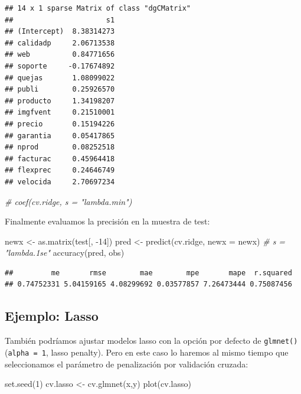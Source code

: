 \documentclass[
  spanish,
]{book}
\newenvironment{Shaded}{\begin{snugshade}}{\end{snugshade}}
\newcommand{\AttributeTok}[1]{\textcolor[rgb]{0.77,0.63,0.00}{#1}}
\newcommand{\CommentTok}[1]{\textcolor[rgb]{0.56,0.35,0.01}{\textit{#1}}}
\newcommand{\DecValTok}[1]{\textcolor[rgb]{0.00,0.00,0.81}{#1}}
\newcommand{\FunctionTok}[1]{\textcolor[rgb]{0.00,0.00,0.00}{#1}}
\newcommand{\NormalTok}[1]{#1}
\newcommand{\OtherTok}[1]{\textcolor[rgb]{0.56,0.35,0.01}{#1}}
\newcommand{\SpecialCharTok}[1]{\textcolor[rgb]{0.00,0.00,0.00}{#1}}
\theoremstyle{break}
\theoremstyle{definition}
\theoremstyle{definition}
\theoremstyle{definition}
\theoremstyle{definition}
\theoremstyle{remark}
\begin{document}
\begin{verbatim}
## 14 x 1 sparse Matrix of class "dgCMatrix"
##                      s1
## (Intercept)  8.38314273
## calidadp     2.06713538
## web          0.84771656
## soporte     -0.17674892
## quejas       1.08099022
## publi        0.25926570
## producto     1.34198207
## imgfvent     0.21510001
## precio       0.15194226
## garantia     0.05417865
## nprod        0.08252518
## facturac     0.45964418
## flexprec     0.24646749
## velocida     2.70697234
\end{verbatim}

\begin{Shaded}
\begin{Highlighting}[]
\CommentTok{\# coef(cv.ridge, s = "lambda.min")}
\end{Highlighting}
\end{Shaded}

Finalmente evaluamos la precisión en la muestra de test:

\begin{Shaded}
\begin{Highlighting}[]
\NormalTok{newx }\OtherTok{\textless{}{-}} \FunctionTok{as.matrix}\NormalTok{(test[, }\SpecialCharTok{{-}}\DecValTok{14}\NormalTok{])}
\NormalTok{pred }\OtherTok{\textless{}{-}} \FunctionTok{predict}\NormalTok{(cv.ridge, }\AttributeTok{newx =}\NormalTok{ newx) }\CommentTok{\# s = "lambda.1se"}
\FunctionTok{accuracy}\NormalTok{(pred, obs)}
\end{Highlighting}
\end{Shaded}

\begin{verbatim}
##         me       rmse        mae        mpe       mape  r.squared 
## 0.74752331 5.04159165 4.08299692 0.03577857 7.26473444 0.75087456
\end{verbatim}

\hypertarget{ejemplo-lasso}{%
\subsection{Ejemplo: Lasso}\label{ejemplo-lasso}}

También podríamos ajustar modelos lasso con la opción por defecto de \texttt{glmnet()} (\texttt{alpha\ =\ 1}, lasso penalty).
Pero en este caso lo haremos al mismo tiempo que seleccionamos el parámetro de penalización por validación cruzada:

\begin{Shaded}
\begin{Highlighting}[]
\FunctionTok{set.seed}\NormalTok{(}\DecValTok{1}\NormalTok{)}
\NormalTok{cv.lasso }\OtherTok{\textless{}{-}} \FunctionTok{cv.glmnet}\NormalTok{(x,y)}
\FunctionTok{plot}\NormalTok{(cv.lasso)}
\end{Highlighting}
\end{Shaded}
\end{document}
